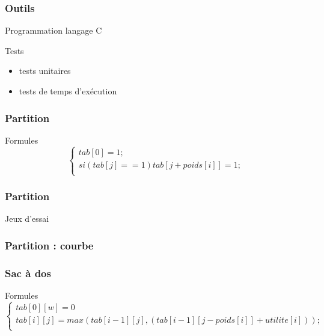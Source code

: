\documentclass[french]{beamer}
\begin{document}
\begin{frame}
\frametitle{Outils}

\begin{block}{Programmation}
langage C
\end{block}

\begin{block}{Tests}
\begin{itemize}
\item tests unitaires
\item tests de temps d'exécution
\end{itemize}
\end{block}

\end{frame}

\begin{frame}
\frametitle{Partition}
\begin{alertblock}{Formules}
\begin{equation}
\begin{cases}
tab[0] = 1; \\
si ( tab[j] == 1 ) {
       tab[j + poids[i]] = 1;
     } \\
\end{cases}
\end{equation}
\end{alertblock}
\end{frame}

\begin{frame}
\frametitle{Partition}
\begin{block}{Jeux d'essai}

\end{block}
\end{frame}

\begin{frame}
\frametitle{Partition : courbe}

\end{frame}

\begin{frame}
\frametitle{Sac à dos}
\begin{alertblock}{Formules}
\begin{equation}
\begin{cases}
tab[0][w] = 0 \\
tab[i][j] = max(tab[i-1] [j], (tab[i-1] [j-poids[i]] + utilite[i])); \\
\end{cases}
\end{equation}
\end{alertblock}
\end{frame}
\end{document}
